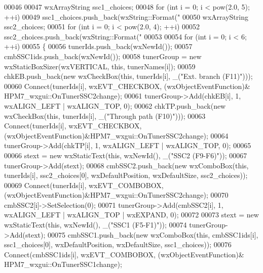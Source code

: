 \begin{DoxyCode}
00046 
00047     wxArrayString ssc1\_choices;
00048     \textcolor{keywordflow}{for} (\textcolor{keywordtype}{int} i = 0; i < pow(2.0, 5); ++i)
00049         ssc1\_choices.push\_back(wxString::Format(\textcolor{stringliteral}{"%
00050     wxArrayString ssc2\_choices;
00051     \textcolor{keywordflow}{for} (\textcolor{keywordtype}{int} i = 0; i < pow(2.0, 4); ++i)
00052         ssc2\_choices.push\_back(wxString::Format(\textcolor{stringliteral}{"%
00053 
00054     \textcolor{keywordflow}{for} (\textcolor{keywordtype}{int} i = 0; i < 6; ++i)
00055     \{
00056         tunerIds.push\_back(wxNewId());
00057         cmbSSC1ids.push\_back(wxNewId());
00058         tunerGroup = \textcolor{keyword}{new} wxStaticBoxSizer(wxVERTICAL, \textcolor{keyword}{this}, tunerNames[i]);
00059         chkEB.push\_back(\textcolor{keyword}{new} wxCheckBox(\textcolor{keyword}{this}, tunerIds[i], \_(\textcolor{stringliteral}{"Ext. branch (F11)"})));
00060         Connect(tunerIds[i], wxEVT\_CHECKBOX, (wxObjectEventFunction)&
      HPM7_wxgui::OnTunerSSC2change);
00061         tunerGroup->Add(chkEB[i], 1, wxALIGN\_LEFT | wxALIGN\_TOP, 0);
00062         chkTP.push\_back(\textcolor{keyword}{new} wxCheckBox(\textcolor{keyword}{this}, tunerIds[i], \_(\textcolor{stringliteral}{"Through path (F10)"})));
00063         Connect(tunerIds[i], wxEVT\_CHECKBOX, (wxObjectEventFunction)&HPM7\_wxgui::OnTunerSSC2change);
00064         tunerGroup->Add(chkTP[i], 1, wxALIGN\_LEFT | wxALIGN\_TOP, 0);
00065 
00066         stext = \textcolor{keyword}{new} wxStaticText(\textcolor{keyword}{this}, wxNewId(), \_(\textcolor{stringliteral}{"SSC2 (F9-F6)"}));
00067         tunerGroup->Add(stext);
00068         cmbSSC2.push\_back(\textcolor{keyword}{new} wxComboBox(\textcolor{keyword}{this}, tunerIds[i], ssc2\_choices[0], wxDefaultPosition, 
      wxDefaultSize, ssc2\_choices));
00069         Connect(tunerIds[i], wxEVT\_COMBOBOX, (wxObjectEventFunction)&HPM7\_wxgui::OnTunerSSC2change);
00070         cmbSSC2[i]->SetSelection(0);
00071         tunerGroup->Add(cmbSSC2[i], 1, wxALIGN\_LEFT | wxALIGN\_TOP | wxEXPAND, 0);
00072 
00073         stext = \textcolor{keyword}{new} wxStaticText(\textcolor{keyword}{this}, wxNewId(), \_(\textcolor{stringliteral}{"SSC1 (F5-F1)"}));
00074         tunerGroup->Add(stext);
00075         cmbSSC1.push\_back(\textcolor{keyword}{new} wxComboBox(\textcolor{keyword}{this}, cmbSSC1ids[i], ssc1\_choices[0], wxDefaultPosition, 
      wxDefaultSize, ssc1\_choices));
00076         Connect(cmbSSC1ids[i], wxEVT\_COMBOBOX, (wxObjectEventFunction)&
      HPM7_wxgui::OnTunerSSC1change);
}}
\end{DoxyCode}
